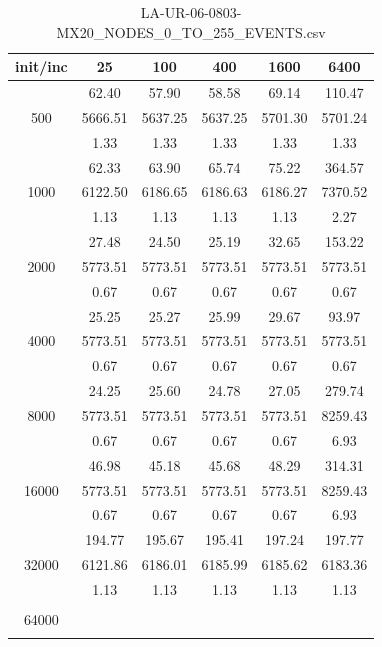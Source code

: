 {\begin{table}[th]
\caption{LA-UR-06-0803-MX20\_NODES\_0\_TO\_255\_EVENTS.csv}
\label{tab:LA-UR-06-0803-MX20_NODES_0_TO_255_EVENTS.csv}
\centering
\begin{tabular}{|c||c|c|c|c|c|}
\hline
init/inc & 25 & 100 & 400 & 1600 & 6400 \\ \hline \hline
  & 62.40 & 57.90 & 58.58 & 69.14 & 110.47\\ 
500  & 5666.51 & 5637.25 & 5637.25 & 5701.30 & 5701.24\\ 
  & 1.33 & 1.33 & 1.33 & 1.33 & 1.33\\ \hline 
  & 62.33 & 63.90 & 65.74 & 75.22 & 364.57\\ 
1000  & 6122.50 & 6186.65 & 6186.63 & 6186.27 & 7370.52\\ 
  & 1.13 & 1.13 & 1.13 & 1.13 & 2.27\\ \hline 
  & 27.48 & 24.50 & 25.19 & 32.65 & 153.22\\ 
2000  & 5773.51 & 5773.51 & 5773.51 & 5773.51 & 5773.51\\ 
  & 0.67 & 0.67 & 0.67 & 0.67 & 0.67\\ \hline 
  & 25.25 & 25.27 & 25.99 & 29.67 & 93.97\\ 
4000  & 5773.51 & 5773.51 & 5773.51 & 5773.51 & 5773.51\\ 
  & 0.67 & 0.67 & 0.67 & 0.67 & 0.67\\ \hline 
  & 24.25 & 25.60 & 24.78 & 27.05 & 279.74\\ 
8000  & 5773.51 & 5773.51 & 5773.51 & 5773.51 & 8259.43\\ 
  & 0.67 & 0.67 & 0.67 & 0.67 & 6.93\\ \hline 
  & 46.98 & 45.18 & 45.68 & 48.29 & 314.31\\ 
16000  & 5773.51 & 5773.51 & 5773.51 & 5773.51 & 8259.43\\ 
  & 0.67 & 0.67 & 0.67 & 0.67 & 6.93\\ \hline 
  & 194.77 & 195.67 & 195.41 & 197.24 & 197.77\\ 
32000  & 6121.86 & 6186.01 & 6185.99 & 6185.62 & 6183.36\\ 
  & 1.13 & 1.13 & 1.13 & 1.13 & 1.13\\ \hline 
  &  &  &  &  & \\ 
64000  &  &  &  &  & \\ 
  &  &  &  &  & \\ \hline 
\end{tabular}
\end{table}

}
